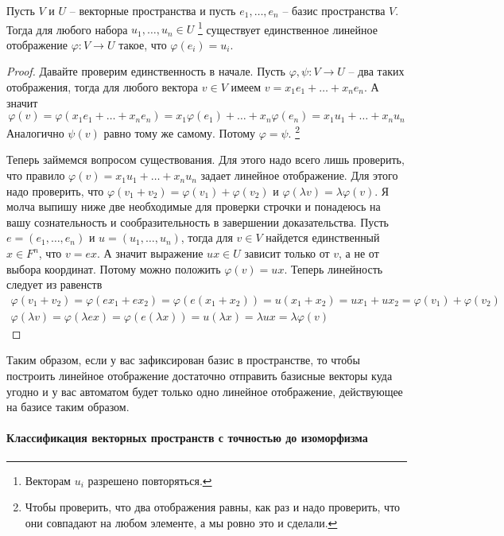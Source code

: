 \begin{claim}
\label{claim::LinMapExist}
Пусть $V$ и $U$ -- векторные пространства и пусть $e_1,\ldots,e_n$ -- базис пространства $V$.
Тогда для любого набора $u_1,\ldots,u_n\in U$%
\footnote{Векторам $u_i$ разрешено повторяться.}
существует единственное линейное отображение $\varphi\colon V\to U$ такое, что $\varphi(e_i) = u_i$.
\end{claim}
\begin{proof}

Давайте проверим единственность в начале.
Пусть $\varphi,\psi\colon V\to U$ -- два таких отображения, тогда для любого вектора $v\in V$ имеем $v = x_1 e_1 + \ldots + x_n e_n$.
А значит
\[
\varphi(v) = \varphi(x_1 e_1 + \ldots + x_n e_n) = x_1 \varphi(e_1) + \ldots + x_n \varphi(e_n) = x_1 u_1 + \ldots + x_n u_n
\]
Аналогично $\psi(v)$ равно тому же самому.
Потому $\varphi = \psi$.%
\footnote{Чтобы проверить, что два отображения равны, как раз и надо проверить, что они совпадают на любом элементе, а мы ровно это и сделали.}

Теперь займемся вопросом существования.
Для этого надо всего лишь проверить, что правило $\varphi(v) =  x_1 u_1 + \ldots + x_n u_n$ задает линейное отображение.
Для этого надо проверить, что $\varphi(v_1 + v_2) = \varphi(v_1) + \varphi(v_2)$ и $\varphi(\lambda v) = \lambda \varphi(v)$.
Я молча выпишу ниже две необходимые для проверки строчки и понадеюсь на вашу сознательность и сообразительность в завершении доказательства.
Пусть $e = (e_1,\ldots,e_n)$ и $u = (u_1,\ldots, u_n)$, тогда для $v\in V$ найдется единственный $x\in F^n$, что $v = ex$.
А значит выражение $ux\in U$ зависит только от $v$, а не от выбора координат.
Потому можно положить $\varphi(v) = ux$.
Теперь линейность следует из равенств
\begin{gather*}
\varphi(v_1 + v_2) = \varphi(ex_1 + ex_2) = \varphi(e(x_1 + x_2)) = u(x_1 + x_2) = u x_1 + ux_2 = \varphi(v_1) + \varphi(v_2)\\
\varphi(\lambda v) = \varphi(\lambda ex) = \varphi(e(\lambda x)) = u (\lambda x) = \lambda u x = \lambda \varphi(v)
\end{gather*}
\end{proof}

Таким образом, если у вас зафиксирован базис в пространстве, то чтобы построить линейное отображение достаточно отправить базисные векторы куда угодно и у вас автоматом будет только одно линейное отображение, действующее на базисе таким образом.

\paragraph{Классификация векторных пространств с точностью до изоморфизма}

